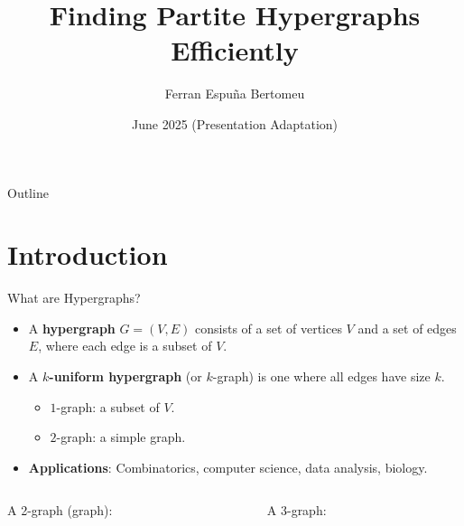 \documentclass{beamer}
\title[Finding Partite Hypergraphs]{Finding Partite Hypergraphs Efficiently}
\author{Ferran Espuña Bertomeu}
\institute{Supervisor: Richard Lang}
\date{June 2025 (Presentation Adaptation)}
\begin{document}
\begin{frame}
  \titlepage
\end{frame}

\begin{frame}{Outline}
  \tableofcontents
\end{frame}

\section{Introduction}

\begin{frame}{What are Hypergraphs?}
  \begin{itemize}
    \item A \textbf{hypergraph} $G=(V,E)$ consists of a set of vertices $V$ and a set of edges $E$, where each edge is a subset of $V$.
    \pause
    \item A \textbf{$k$-uniform hypergraph} (or $k$-graph) is one where all edges have size $k$.
    \begin{itemize}
        \item $1$-graph: a subset of $V$.
        \item $2$-graph: a simple graph.
    \end{itemize}
    \pause
    \item \textbf{Applications}: Combinatorics, computer science, data analysis, biology.
  \end{itemize}
  \vfill
  \begin{columns}[T]
    \begin{column}{0.45\textwidth}
      \centering
      A 2-graph (graph):\\
    \end{column}
    \begin{column}{0.45\textwidth}
      \centering
      A 3-graph:\\
    \end{column}
  \end{columns}
\end{frame}
\end{document}

